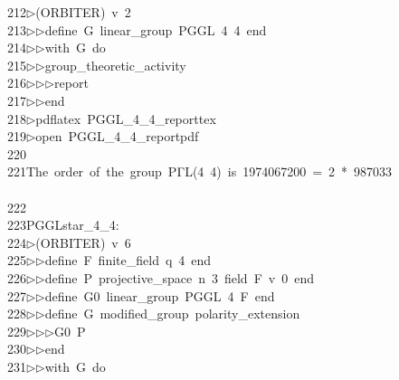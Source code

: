 \begin{tabbing}
212\>$\triangleright$\>(ORBITER)\ v\ 2\ \\[0pt]
213\>$\triangleright$\>$\triangleright$\>define\ G\ linear\_group\ PGGL\ 4\ 4\ end\ \\[0pt]
214\>$\triangleright$\>$\triangleright$\>with\ G\ do\ \\[0pt]
215\>$\triangleright$\>$\triangleright$\>group\_theoretic\_activity\ \\[0pt]
216\>$\triangleright$\>$\triangleright$\>$\triangleright$\>report\ \\[0pt]
217\>$\triangleright$\>$\triangleright$\>end\\[0pt]
218\>$\triangleright$\>pdflatex\ PGGL\_4\_4\_reporttex\\[0pt]
219\>$\triangleright$\>open\ PGGL\_4\_4\_reportpdf\\[0pt]
220\>\\[0pt]
221\>The\ order\ of\ the\ group\ PΓL(4\ 4)\ is\ 1974067200\ =\ 2\ *\ 987033\\[0pt]
\\[0pt]
222\>\\[0pt]
223\>PGGLstar\_4\_4:\\[0pt]
224\>$\triangleright$\>(ORBITER)\ v\ 6\ \\[0pt]
225\>$\triangleright$\>$\triangleright$\>define\ F\ finite\_field\ q\ 4\ end\ \\[0pt]
226\>$\triangleright$\>$\triangleright$\>define\ P\ projective\_space\ n\ 3\ field\ F\ v\ 0\ end\ \\[0pt]
227\>$\triangleright$\>$\triangleright$\>define\ G0\ linear\_group\ PGGL\ 4\ F\ end\ \\[0pt]
228\>$\triangleright$\>$\triangleright$\>define\ G\ modified\_group\ polarity\_extension\ \\[0pt]
229\>$\triangleright$\>$\triangleright$\>$\triangleright$\>G0\ P\ \\[0pt]
230\>$\triangleright$\>$\triangleright$\>end\ \\[0pt]
231\>$\triangleright$\>$\triangleright$\>with\ G\ do\ \\[0pt]

\end{tabbing}
